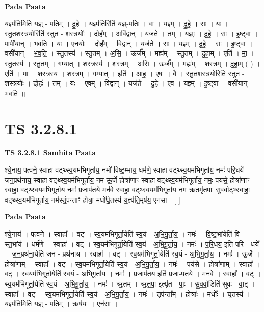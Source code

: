 \documentclass[17pt]{extarticle}
\begin{document}
\textbf{Pada Paata} \newline

य॒ज्ञ्प॑ति॒मिति॑ य॒ज्ञ् - प॒ति॒म् । दु॒हे । य॒ज्ञ्प॑ति॒रिति॑ य॒ज्ञ्-प॒तिः॒ । वा॒ । य॒ज्ञ्म् । दु॒हे॒ । सः । यः । स्तु॒त॒श॒स्त्रयो॒रिति॑ स्तुत - श॒स्त्रयोः᳚ । दोह᳚म् । अवि॑द्वान् । यज॑ते । तम् । य॒ज्ञ्ः । दु॒हे॒ । सः । इ॒ष्ट्वा । पापी॑यान् । भ॒व॒ति॒ । यः । ए॒न॒योः॒ । दोह᳚म् । वि॒द्वान् । यज॑ते । सः । य॒ज्ञ्म् । दु॒हे॒ । सः । इ॒ष्ट्वा । वसी॑यान् । भ॒व॒ति॒ । स्तु॒तस्य॑ । स्तु॒तम् । अ॒सि॒ । ऊर्ज᳚म् । मह्य᳚म् । स्तु॒तम् । दु॒हा॒म् । एति॑ । मा॒ । स्तु॒तस्य॑ । स्तु॒तम् । ग॒म्या॒त् । श॒स्त्रस्य॑ । श॒स्त्रम् । अ॒सि॒ । ऊर्ज᳚म् । मह्य᳚म् । श॒स्त्रम् । दु॒हा॒म् ( ) । एति॑ । मा॒ । श॒स्त्रस्य॑ । श॒स्त्रम् । ग॒म्या॒त् । इति॑ । आ॒ह॒ । ए॒षः । वै । स्तु॒त॒श॒स्त्रयो॒रिति॑ स्तुत - श॒स्त्रयोः᳚ । दोहः॑ । तम् । यः । ए॒वम् । वि॒द्वान् । यज॑ते । दु॒हे । ए॒व । य॒ज्ञ्म् । इ॒ष्ट्वा । वसी॑यान् । भ॒व॒ति॒ ॥  \newline




\section*{ TS 3.2.8.1 }

\textbf{TS 3.2.8.1 } \newline
\textbf{Samhita Paata} \newline

श्ये॒नाय॒ पत्व॑ने॒ स्वाहा॒ वट्थ्स्व॒यम॑भिगूर्ताय॒ नमो॑ विष्ट॒म्भाय॒ धर्म॑णे॒ स्वाहा॒ वट्थ्स्व॒यम॑भिगूर्ताय॒ नमः॑ परि॒धये॑ जन॒प्रथ॑नाय॒ स्वाहा॒ वट्थ्स्व॒यम॑भिगूर्ताय॒ नम॑ ऊ॒र्जे होत्रा॑णाꣳ॒॒ स्वाहा॒ वट्थ्स्व॒यम॑भिगूर्ताय॒ नमः॒ पय॑से॒ होत्रा॑णाꣳ॒॒ स्वाहा॒ वट्थ्स्व॒यम॑भिगूर्ताय॒ नमः॑ प्र॒जाप॑तये॒ मन॑वे॒ स्वाहा॒ वट्थ्स्व॒यम॑भिगूर्ताय॒ नम॑ ऋ॒तमृ॑तपाः सुवर्वा॒ट्थ्स्वाहा॒ वट्थ्स्व॒यम॑भिगूर्ताय॒ नम॑स्तृं॒पन्ताꣳ॒॒ होत्रा॒ मधो᳚र्घृ॒तस्य॑ य॒ज्ञ्प॑ति॒मृष॑य॒ एन॑सा - [  ] \newline

\textbf{Pada Paata} \newline

श्ये॒नाय॑ । पत्व॑ने । स्वाहा᳚ । वट् । स्व॒यम॑भिगूर्ता॒येति॑ स्व॒यं - अ॒भि॒गू॒र्ता॒य॒ । नमः॑ । वि॒ष्ट॒भांयेति॑ वि - स्त॒भांय॑ । धर्म॑णे । स्वाहा᳚ । वट् । स्व॒यम॑भिगूर्ता॒येति॑ स्व॒यं - अ॒भि॒गू॒र्ता॒य॒ । नमः॑ । प॒रि॒धय॒ इति॑ परि - धये᳚ । ज॒न॒प्रथ॑ना॒येति॑ जन - प्रथ॑नाय । स्वाहा᳚ । वट् । स्व॒यम॑भिगूर्ता॒येति॑ स्व॒यं - अ॒भि॒गू॒र्ता॒य॒ । नमः॑ । ऊ॒र्जे । होत्रा॑णाम् । स्वाहा᳚ । वट् । स्व॒यम॑भिगूर्ता॒येति॑ स्व॒यं - अ॒भि॒गू॒र्ता॒य॒ । नमः॑ । पय॑से । होत्रा॑णाम् । स्वाहा᳚ । वट् । स्व॒यम॑भिगूर्ता॒येति॑ स्व॒यं - अ॒भि॒गू॒र्ता॒य॒ । नमः॑ । प्र॒जाप॑तय॒ इति॑ प्र॒जा-प॒त॒ये॒ । मन॑वे । स्वाहा᳚ । वट् । स्व॒यम॑भिगूर्ता॒येति॑ स्व॒यं - अ॒भि॒गू॒र्ता॒य॒ । नमः॑ । ऋ॒तम् । ऋ॒त॒पा॒ इत्यृ॑त - पाः॒ । सु॒व॒र्वा॒डिति॑ सुवः - वा॒ट् । स्वाहा᳚ । वट् । स्व॒यम॑भिगूर्ता॒येति॑ स्व॒यं - अ॒भि॒गू॒र्ता॒य॒ । नमः॑ । तृ॒पंन्ता᳚म् । होत्राः᳚ । मधोः᳚ । घृ॒तस्य॑ । य॒ज्ञ्प॑ति॒मिति॑ य॒ज्ञ् - प॒ति॒म् । ऋष॑यः । एन॑सा ।  \newline
\end{document}

